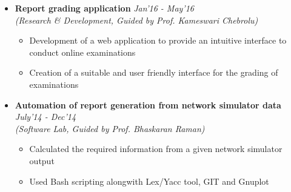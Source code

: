 \begin{itemize}
	\item \textbf{Report grading application} \hfill \emph{Jan'16 - May'16} \\
	\emph{(Research \& Development, Guided by Prof. Kameswari Chebrolu)} \hfill \\[-0.6cm]
	\begin{itemize}
		\item Development of a web application to provide an intuitive interface to conduct online examinations \\[-0.5cm]
		\item Creation of a suitable and user friendly interface for the grading of examinations \\[-0.6cm]
	\end{itemize}
	
	\item \textbf{Automation of report generation from network simulator data} \hfill \emph{July'14 - Dec'14} \\
	\emph{(Software Lab, Guided by Prof. Bhaskaran Raman)} \hfill \\[-0.6cm]
	\begin{itemize}
	    \item Calculated the required information from a given network simulator output \\[-0.5cm]
	    \item Used Bash scripting alongwith Lex/Yacc tool, GIT and Gnuplot \\[-0.5cm]
	\end{itemize}
	


\end{itemize}
